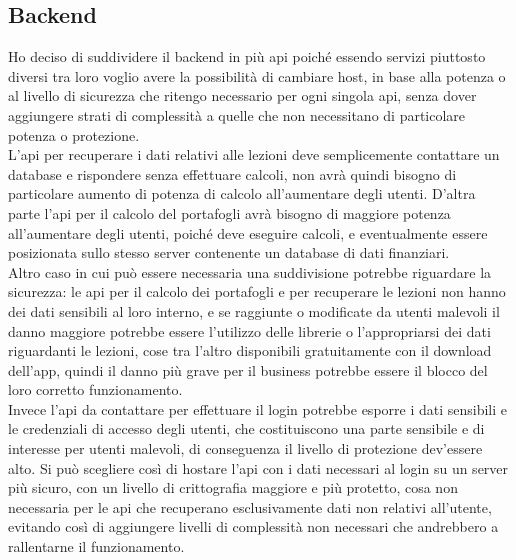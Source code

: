 \newpage
\subsection{Backend}
Ho deciso di suddividere il backend in più api poiché essendo servizi piuttosto diversi tra loro voglio avere la possibilità di cambiare host, in base alla potenza o al livello di sicurezza che ritengo necessario per ogni singola api, senza dover aggiungere strati di complessità a quelle che non necessitano di particolare potenza o protezione.\\
L’api per recuperare i dati relativi alle lezioni deve semplicemente contattare un database e rispondere senza effettuare calcoli, non avrà quindi bisogno di particolare aumento di potenza di calcolo all’aumentare degli utenti. D’altra parte l’api per il calcolo del portafogli avrà bisogno di maggiore potenza all’aumentare degli utenti, poiché deve eseguire calcoli, e eventualmente essere posizionata sullo stesso server contenente un database di dati finanziari.\\
Altro caso in cui può essere necessaria una suddivisione potrebbe riguardare la sicurezza: le api per il calcolo dei portafogli e per recuperare le lezioni non hanno dei dati sensibili al loro interno, e se raggiunte o modificate da utenti malevoli il danno maggiore potrebbe essere l’utilizzo delle librerie o l’appropriarsi dei dati riguardanti le lezioni, cose tra l’altro disponibili gratuitamente con il download dell’app, quindi il danno più grave per il business potrebbe essere il blocco del loro corretto funzionamento.\\
Invece l’api da contattare per effettuare il login potrebbe esporre i dati sensibili e le credenziali di accesso degli utenti, che costituiscono una parte sensibile e di interesse per utenti malevoli, di conseguenza il livello di protezione dev’essere alto. Si può scegliere così di hostare l’api con i dati necessari al login su un server più sicuro, con un livello di crittografia maggiore e più protetto, cosa non necessaria per le api che recuperano esclusivamente dati non relativi all’utente, evitando così di aggiungere livelli di complessità non necessari che andrebbero a rallentarne il funzionamento.\\

